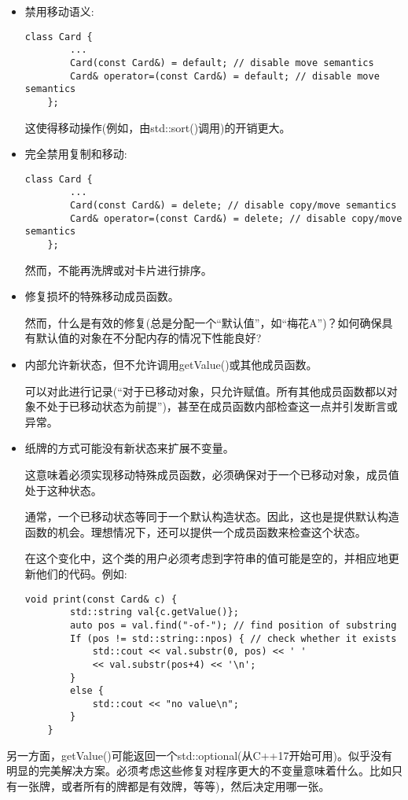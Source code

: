 \begin{itemize}
	\item 禁用移动语义:\par
	\begin{lstlisting}[caption={}]
	class Card {
		...
		Card(const Card&) = default; // disable move semantics
		Card& operator=(const Card&) = default; // disable move semantics
	};
	\end{lstlisting}
	这使得移动操作(例如，由std::sort()调用)的开销更大。
	\item 完全禁用复制和移动:\par
	\begin{lstlisting}[caption={}]
	class Card {
		...
		Card(const Card&) = delete; // disable copy/move semantics
		Card& operator=(const Card&) = delete; // disable copy/move semantics
	};
	\end{lstlisting}
	然而，不能再洗牌或对卡片进行排序。
	\item 修复损坏的特殊移动成员函数。\par
	然而，什么是有效的修复(总是分配一个“默认值”，如“梅花A”)？如何确保具有默认值的对象在不分配内存的情况下性能良好?
	\item 内部允许新状态，但不允许调用getValue()或其他成员函数。\par
	可以对此进行记录(“对于已移动对象，只允许赋值。所有其他成员函数都以对象不处于已移动状态为前提”)，甚至在成员函数内部检查这一点并引发断言或异常。
	\item 纸牌的方式可能没有新状态来扩展不变量。\par
	这意味着必须实现移动特殊成员函数，必须确保对于一个已移动对象，成员值处于这种状态。\par
	通常，一个已移动状态等同于一个默认构造状态。因此，这也是提供默认构造函数的机会。理想情况下，还可以提供一个成员函数来检查这个状态。\par
	在这个变化中，这个类的用户必须考虑到字符串的值可能是空的，并相应地更新他们的代码。例如:\par
	\begin{lstlisting}[caption={}]
	void print(const Card& c) {
		std::string val{c.getValue()};
		auto pos = val.find("-of-"); // find position of substring
		If (pos != std::string::npos) { // check whether it exists
			std::cout << val.substr(0, pos) << ' '
			<< val.substr(pos+4) << '\n';
		}
		else {
			std::cout << "no value\n";
		}
	}
	\end{lstlisting}
\end{itemize}

另一方面，getValue()可能返回一个std::optional(从C++17开始可用)。似乎没有明显的完美解决方案。必须考虑这些修复对程序更大的不变量意味着什么。比如只有一张牌，或者所有的牌都是有效牌，等等)，然后决定用哪一张。\par

